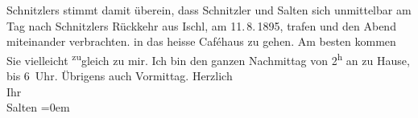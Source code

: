 \begin{ledgroupsized}[t]{13cm}
{{{                     Schnitzlers stimmt damit überein, dass
                     Schnitzler und Salten sich unmittelbar am Tag nach Schnitzlers Rückkehr aus Ischl, am 11. 8. 1895, trafen und den Abend miteinander
                  verbrachten.}}}\label{K_L03162-1h} in das heisse Caféhaus zu gehen. Am besten kommen Sie
               vielleicht \substVorne{}\textsuperscript{zu}\substDazwischen{}gl\substHinten{}eich zu mir. Ich bin den ganzen Nachmittag von 2\textsuperscript{h} an zu Hause, bis
                  6 Uhr. Übrigens auch Vor{\pb}mittag.\pend
           \pstart
           Herzlich {\\[\baselineskip]}Ihr {\\[\baselineskip]}\spacefill\mbox{Salten}\pend
           \leftskip=0em{}
         
         \endnumbering{}\end{ledgroupsized}  \newcommand{\dateiname}{L03162}\newcommand{\titel}{Felix Salten an Arthur Schnitzler, [10.? 8. 1895]}\newcommand{\editorInnen}{Martin Anton Müller und Laura Untner}
      